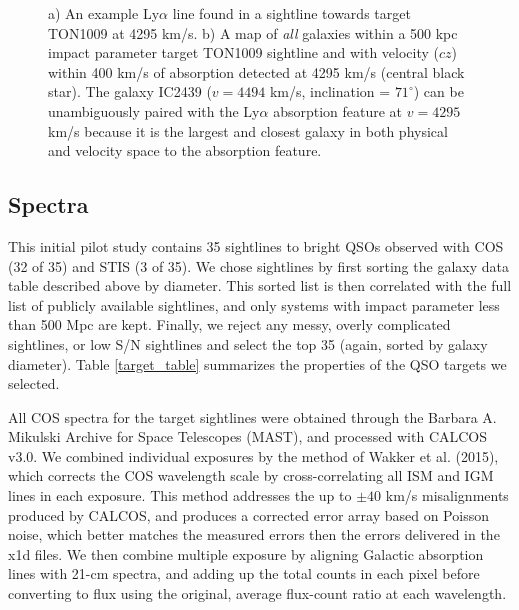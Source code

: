 \documentclass[iop]{emulateapj-rtx4}
\begin{document}
\begin{figure}[h!]
  \caption{\small{a) An example Ly$\alpha$ line found in a sightline towards target TON1009 at 4295 km/s. b) A map of \textit{all} galaxies within a 500 kpc impact parameter target TON1009 sightline and with velocity ($cz$) within 400 km/s of absorption detected at 4295 km/s (central black star). The galaxy IC2439 ($v=4494$ km/s, inclination = $71^{\circ}$) can be unambiguously paired with the Ly$\alpha$ absorption feature at $v=4295$ km/s because it is the largest and closest galaxy in both physical and velocity space to the absorption feature.}}
\vspace{5pt}
\end{figure}


\subsection{Spectra}

This initial pilot study contains 35 sightlines to bright QSOs observed with COS (32 of 35) and STIS (3 of 35). We chose sightlines by first sorting the galaxy data table described above by diameter. This sorted list is then correlated with the full list of publicly available sightlines, and only systems with impact parameter less than 500 Mpc are kept. Finally, we reject any messy, overly complicated sightlines, or low S/N sightlines and select the top 35 (again, sorted by galaxy diameter). Table \ref{target_table} summarizes the properties of the QSO targets we selected.


All COS spectra for the target sightlines were obtained through the Barbara A. Mikulski Archive for Space Telescopes (MAST), and processed with CALCOS v3.0. We combined individual exposures by the method of Wakker et al. (2015), which corrects the COS wavelength scale by cross-correlating all ISM and IGM lines in each exposure. This method addresses the up to $\pm40$ km/s misalignments produced by CALCOS, and produces a corrected error array based on Poisson noise, which better matches the measured errors then the errors delivered in the x1d files. We then combine multiple exposure by aligning Galactic absorption lines with 21-cm spectra, and adding up the total counts in each pixel before converting to flux using the original, average flux-count ratio at each wavelength.
\end{document}
